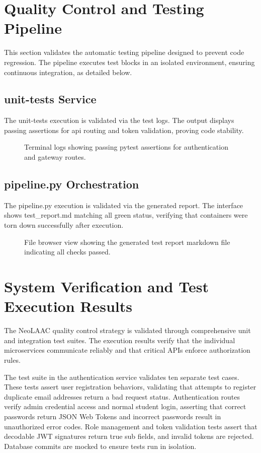 \documentclass[12pt]{article}
\begin{document}
\section{Quality Control and Testing Pipeline}
This section validates the automatic testing pipeline designed to prevent code regression. The pipeline executes test blocks in an isolated environment, ensuring continuous integration, as detailed below.

\subsection{unit-tests Service}
The unit-tests execution is validated via the test logs. The output displays passing assertions for api routing and token validation, proving code stability.

\begin{figure}[htbp]
    \centering
    \caption{Terminal logs showing passing pytest assertions for authentication and gateway routes.}
    \label{fig:tests_execution}
\end{figure}

\subsection{pipeline.py Orchestration}
The pipeline.py execution is validated via the generated report. The interface shows test_report.md matching all green status, verifying that containers were torn down successfully after execution.

\begin{figure}[htbp]
    \centering
    \caption{File browser view showing the generated test report markdown file indicating all checks passed.}
    \label{fig:pipeline_report}
\end{figure}

\section{System Verification and Test Execution Results}
The NeoLAAC quality control strategy is validated through comprehensive unit and integration test suites. The execution results verify that the individual microservices communicate reliably and that critical APIs enforce authorization rules.

The test suite in the authentication service validates ten separate test cases. These tests assert user registration behaviors, validating that attempts to register duplicate email addresses return a bad request status. Authentication routes verify admin credential access and normal student login, asserting that correct passwords return JSON Web Tokens and incorrect passwords result in unauthorized error codes. Role management and token validation tests assert that decodable JWT signatures return true sub fields, and invalid tokens are rejected. Database commits are mocked to ensure tests run in isolation.
\end{document}
